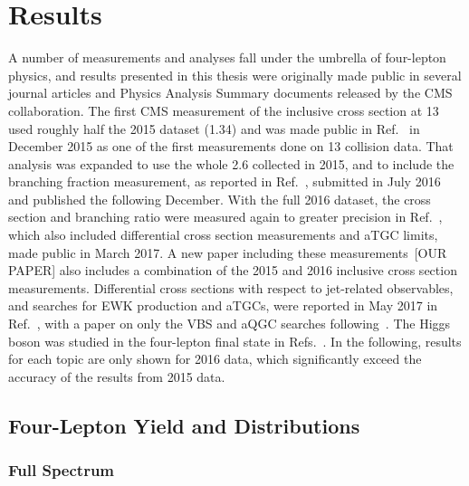 
\chapter{Results}\label{ch:results}

A number of measurements and analyses fall under the umbrella of four-lepton physics, and results presented in this thesis were originally made public in several journal articles and Physics Analysis Summary documents released by the CMS collaboration.
The first CMS measurement of the {\ZZ} inclusive cross section at {13\TeV} used roughly half the 2015 dataset ({1.34\fbinv}) and was made public in Ref.~\cite{CMS:2015fnj} in December 2015 as one of the first measurements done on {13\TeV} collision data.
That analysis was expanded to use the whole {2.6\fbinv} collected in 2015, and to include the {\Zfourl} branching fraction measurement, as reported in Ref.~\cite{Khachatryan:2016txa}, submitted in July 2016 and published the following December.
With the full 2016 dataset, the {\ZZ} cross section and {\Zfourl} branching ratio were measured again to greater precision in Ref.~\cite{CMS:2017ruh}, which also included differential cross section measurements and aTGC limits, made public in March 2017.
A new paper including these measurements~[OUR PAPER] also includes a combination of the 2015 and 2016 inclusive cross section measurements. %
Differential cross sections with respect to jet-related observables, and searches for EWK {\ZZ} production and aTGCs, were reported in May 2017 in Ref.~\cite{CMS:2017dyw}, with a paper on only the VBS and aQGC searches following~\cite{Sirunyan:2017fvv}.
The Higgs boson was studied in the four-lepton final state in Refs.~\cite{CMS:2016rqf,CMS:2016ilx,Sirunyan:2017exp}.
In the following, results for each topic are only shown for 2016 data, which significantly exceed the accuracy of the results from 2015 data.



\section{Four-Lepton Yield and Distributions}


\subsection{Full Spectrum}

